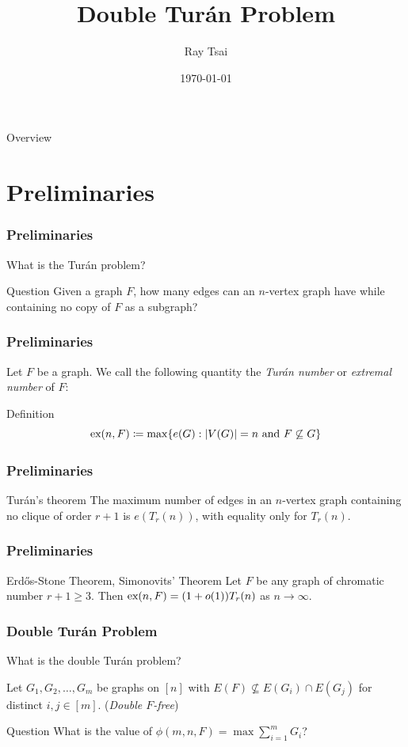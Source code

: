 \documentclass{beamer}
\title{Double Turán Problem}
\author{Ray Tsai}
\date{\today}
\newcommand*{\ex}{\textnormal{ex}}
\begin{document}
\frame{\titlepage}

\begin{frame}{Overview}
  \tableofcontents
\end{frame}

\section{Preliminaries}

\begin{frame}
\frametitle{Preliminaries}
What is the Turán problem? \pause

\begin{block}{Question}
  Given a graph $F$, how many edges can an $n$-vertex graph have while containing no copy of $F$ as a subgraph?
\end{block}
\end{frame}

\begin{frame}
\frametitle{Preliminaries}

Let $F$ be a graph. We call the following quantity the \textit{Turán number} or \textit{extremal number} of $F$:

\begin{block}{Definition}
  \[
    \ex(n, F) \coloneq \max \{ e(G) : |V(G)| = n \text{ and } F \not\subseteq G \}
  \]
\end{block}
\end{frame}
\begin{frame}
  \frametitle{Preliminaries}

  \begin{block}{Turán's theorem}
    The maximum number of edges in an $n$-vertex graph containing no clique of order $r + 1$ is $e(T_r(n))$, with equality only for $T_r(n)$.
  \end{block}
\end{frame}

\begin{frame}
  \frametitle{Preliminaries}

  \begin{block}{Erd\H{o}s-Stone Theorem, Simonovits' Theorem}
    Let $F$ be any graph of chromatic number $r + 1 \geq 3$. Then $\ex(n, F) = (1 + o(1))T_r(n)$ as $n \rightarrow \infty$.
  \end{block}
\end{frame}

\begin{frame}
\frametitle{Double Turán Problem}

What is the double Turán problem? \pause

\vspace{0.5cm}

Let $G_1, G_2, \ldots, G_m$ be graphs on $[n]$ with $E(F) \not\subseteq E(G_i) \cap E(G_j)$ for distinct $i, j \in [m]$. \pause (\textit{Double $F$-free})

\pause

\begin{block}{Question}
  What is the value of $\phi(m, n, F) = \max \sum_{i = 1}^m G_i$?
\end{block}
\end{frame}
\end{document}
